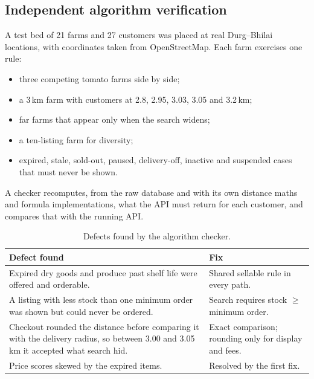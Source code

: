 \documentclass[11pt,a4paper]{article}
\begin{document}
\subsection{Independent algorithm verification}

A test bed of 21 farms and 27 customers was placed at real Durg--Bhilai locations, with coordinates taken from OpenStreetMap. Each farm exercises one rule:
\begin{itemize}
  \item three competing tomato farms side by side;
  \item a 3\,km farm with customers at 2.8, 2.95, 3.03, 3.05 and 3.2\,km;
  \item far farms that appear only when the search widens;
  \item a ten-listing farm for diversity;
  \item expired, stale, sold-out, paused, delivery-off, inactive and suspended cases that must never be shown.
\end{itemize}
A checker recomputes, from the raw database and with its own distance maths and formula implementations, what the API must return for each customer, and compares that with the running API.

\begin{table}[H]\centering\small
\begin{tabularx}{\linewidth}{@{}Lp{6cm}@{}}
\toprule
\textbf{Defect found} & \textbf{Fix} \\
\midrule
Expired dry goods and produce past shelf life were offered and orderable. & Shared sellable rule in every path. \\
A listing with less stock than one minimum order was shown but could never be ordered. & Search requires stock $\ge$ minimum order. \\
Checkout rounded the distance before comparing it with the delivery radius, so between 3.00 and 3.05\,km it accepted what search hid. & Exact comparison; rounding only for display and fees. \\
Price scores skewed by the expired items. & Resolved by the first fix. \\
\bottomrule
\end{tabularx}
\caption{Defects found by the algorithm checker.}
\end{table}
\end{document}

